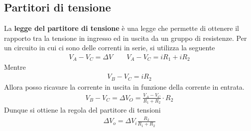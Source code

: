 \documentclass[a4paper, oneside]{article}
\begin{document}
\subsection{Partitori di tensione}
La \textbf{legge del partitore di tensione} è una legge che permette di 
ottenere il rapporto tra la tensione in ingresso ed in uscita da un gruppo di resistenze.
Per un circuito in cui ci sono delle correnti in serie, si utilizza la seguente
\begin{gather*}
    V_A - V_C = \Delta V \qquad V_A - V_C = iR_1 + iR_2
\end{gather*}
Mentre
\begin{gather*}
    V_B - V_C = iR_2
\end{gather*}
Allora posso ricavare la corrente in uscita in funzione della corrente in entrata.
\begin{gather*}
    V_B - V_C = \Delta V_O = \frac{V_A - V_C}{R_1 + R_2} \cdot R_2
\end{gather*}
Dunque si ottiene la regola del partitore di tensioni
\begin{align}
    \Delta V_{o} = \Delta V_i \frac{R_2}{R_1 + R_2}
\end{align}
\end{document}
